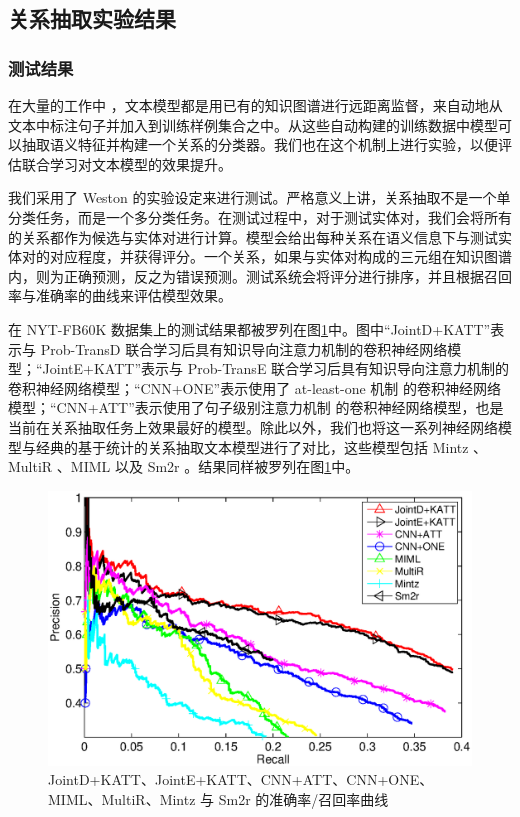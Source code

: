 \subsection{关系抽取实验结果}

\subsubsection{测试结果}

在大量的工作中 \cite{mintz2009distant,riedel2010modeling,hoffmann2011knowledge,surdeanu2012multi,zeng2014relation,zeng2015distant,lin2016neural}，文本模型都是用已有的知识图谱进行远距离监督，来自动地从文本中标注句子并加入到训练样例集合之中。从这些自动构建的训练数据中模型可以抽取语义特征并构建一个关系的分类器。我们也在这个机制上进行实验，以便评估联合学习对文本模型的效果提升。

我们采用了 Weston \cite{weston2013connecting}的实验设定来进行测试。严格意义上讲，关系抽取不是一个单分类任务，而是一个多分类任务。在测试过程中，对于测试实体对，我们会将所有的关系都作为候选与实体对进行计算。模型会给出每种关系在语义信息下与测试实体对的对应程度，并获得评分。一个关系，如果与实体对构成的三元组在知识图谱内，则为正确预测，反之为错误预测。测试系统会将评分进行排序，并且根据召回率与准确率的曲线来评估模型效果。

在 NYT-FB60K 数据集上的测试结果都被罗列在图\ref{fig3:jointcnn}中。图中``JointD+KATT''表示与 Prob-TransD 联合学习后具有知识导向注意力机制的卷积神经网络模型；``JointE+KATT''表示与 Prob-TransE 联合学习后具有知识导向注意力机制的卷积神经网络模型；``CNN+ONE''表示使用了 at-least-one 机制 \cite{zeng2015distant} 的卷积神经网络模型；``CNN+ATT''表示使用了句子级别注意力机制 \cite{lin2016neural} 的卷积神经网络模型，也是当前在关系抽取任务上效果最好的模型。除此以外，我们也将这一系列神经网络模型与经典的基于统计的关系抽取文本模型进行了对比，这些模型包括 Mintz \cite{mintz2009distant}、MultiR \cite{hoffmann2011knowledge}、MIML \cite{surdeanu2012multi} 以及 Sm2r \cite{weston2013connecting}。结果同样被罗列在图\ref{fig3:jointcnn}中。

\begin{figure}[h]
\centering
\includegraphics[width=1\columnwidth]{figures/ch3/res.eps}
\caption{JointD+KATT、JointE+KATT、CNN+ATT、CNN+ONE、MIML、MultiR、Mintz 与 Sm2r 的准确率/召回率曲线}
\label{fig3:jointcnn}
\end{figure} 

